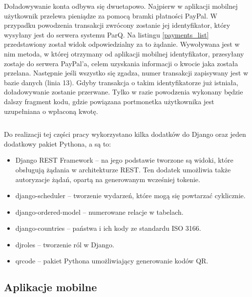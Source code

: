 Doładowywanie konta odbywa się dwuetapowo. Najpierw w aplikacji mobilnej użytkownik przelewa pieniądze za pomocą bramki płatności PayPal. W przypadku powodzenia transakcji zwrócony zostanie jej identyfikator, który wysyłany jest do serwera systemu ParQ. Na listingu \ref{payments_list} przedstawiony został widok odpowiedzialny za to żądanie. Wywoływana jest w nim metoda, w której otrzymany od aplikacji mobilnej identyfikator, przesyłany zostaje do serwera PayPal'a, celem uzyskania informacji o kwocie jaka została przelana. Następnie jeśli wszystko się zgadza, numer transakcji zapisywany jest w bazie danych (linia 13). Gdyby transakcja o takim identyfikatorze już istniała, doładowywanie zostanie przerwane. Tylko w razie powodzenia wykonany będzie dalszy fragment kodu, gdzie powiązana portmonetka użytkownika jest uzupełniana o wpłaconą kwotę.

\begin{singlespace}
	\label{payments_list}
	\vspace{0.3cm}
	\inputminted[fontsize=\footnotesize]{python}{src/imp/paypal-views.py}
\end{singlespace}

\vspace{0.3cm}
Do realizacji tej części pracy wykorzystano kilka dodatków do Django oraz jeden dodatkowy pakiet Pythona, a są to:

\begin{itemize}
	\item Django REST Framework -- na jego podstawie tworzone są widoki, które obsługują żądania w architekturze REST. Ten dodatek umożliwia także autoryzacje żądań, opartą na generowanym wcześniej tokenie.
	\item django-scheduler -- tworzenie wydarzeń, które mogą się powtarzać cyklicznie.
	\item django-ordered-model -- numerowane relacje w tabelach.
	\item django-countries -- państwa i ich kody ze standardu ISO 3166.
	\item djroles -- tworzenie ról w Django.
	\item qrcode -- pakiet Pythona umożliwiający generowanie kodów QR.
\end{itemize}

\subsection{Aplikacje mobilne}

